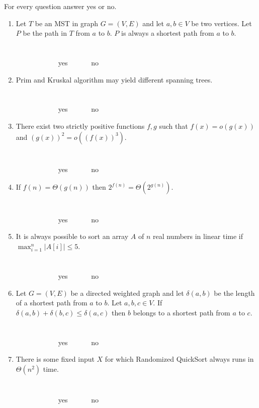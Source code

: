 \documentclass[letterpaper, 11pt]{article}
\begin{document}
For every question answer yes or no.
\begin{enumerate}

\item Let $T$ be an MST in graph $G=(V,E)$ and let $a,b\in V$ be two vertices. Let $P$ be the path in $T$ from $a$ to $b$. $P$ is always a shortest path from $a$ to $b$. \\ \\ \\ \ \ \ \ \ \ \  \ \ \ \ \ yes \ \  \ \ \ \ no       \\
\item Prim and Kruskal algorithm may yield different spanning trees. \\ \\ \\ \ \ \ \ \ \ \  \ \ \ \ \ yes \ \  \ \ \ \ no       \\
\item There exist two strictly positive functions $f,g$ such that $f(x) = o(g(x))$ and $(g(x))^2=o((f(x))^3)$. \\ \\ \\ \ \ \ \ \ \ \  \ \ \ \ \ yes \ \  \ \ \ \ no       \\
\item If $f(n) = \Theta(g(n))$ then $2^{f(n)} = \Theta\left(2^{g(n)}\right)$. \\ \\ \\ \ \ \ \ \ \ \  \ \ \ \ \ yes \ \  \ \ \ \ no       \\
\item It is always possible to sort an array $A$ of $n$ real numbers in linear time if $\max_{i=1}^n|A[i]|\le 5$. \\ \\ \\ \ \ \ \ \ \ \  \ \ \ \ \ yes \ \  \ \ \ \ no       \\

\item Let $G=(V,E)$ be a directed weighted graph and let $\delta(a,b)$ be the length of a shortest path from $a$ to $b$. 
Let $a,b,c \in V$. If $\delta(a,b) + \delta(b,c) \le \delta(a,c)$ then $b$ belongs to a shortest path from $a$ to $c$. \\ \\ \\ \ \ \ \ \ \ \  \ \ \ \ \ yes \ \  \ \ \ \ no       \\
\item There is some fixed input $X$ for which Randomized QuickSort always runs in $\Theta(n^2)$ time. \\ \\ \\ \ \ \ \ \ \ \  \ \ \ \ \ yes \ \  \ \ \ \ no       \\


\end{enumerate}
\end{document}
